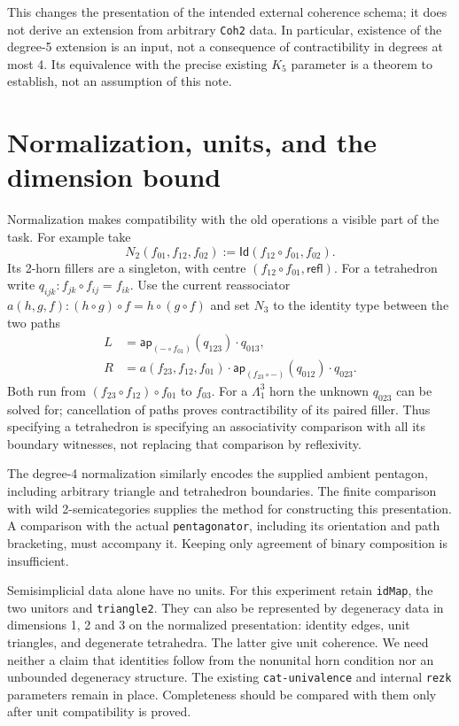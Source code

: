 \documentclass[11pt]{amsart}
\newcommand{\Id}{\mathsf{Id}}
\newcommand{\code}[1]{\nolinkurl{#1}}
\theoremstyle{definition}
\begin{document}
This changes the presentation of the intended external coherence schema;
it does not derive an extension from arbitrary \code{Coh2} data.
In particular, existence of the degree-5 extension is an input, not a
consequence of contractibility in degrees at most 4. Its equivalence
with the precise existing $K_5$ parameter is a theorem to establish,
not an assumption of this note.

\section{Normalization, units, and the dimension bound}

Normalization makes compatibility with the old operations a visible
part of the task. For example take
\[
 N_2(f_{01},f_{12},f_{02})
   :=\Id(f_{12}\circ f_{01},f_{02}).
\]
Its 2-horn fillers are a singleton, with centre
$(f_{12}\circ f_{01},\mathsf{refl})$.
For a tetrahedron write $q_{ijk}:f_{jk}\circ f_{ij}=f_{ik}$.
Use the current reassociator
$a(h,g,f):(h\circ g)\circ f=h\circ(g\circ f)$ and set $N_3$ to
the identity type between the two paths
\begin{align*}
 L&=\mathsf{ap}_{(-\circ f_{01})}(q_{123})\cdot q_{013},\\
 R&=a(f_{23},f_{12},f_{01})\cdot
       \mathsf{ap}_{(f_{23}\circ-)}(q_{012})\cdot q_{023}.
\end{align*}
Both run from $(f_{23}\circ f_{12})\circ f_{01}$ to $f_{03}$.
For a $\Lambda^3_1$ horn the unknown $q_{023}$ can be solved for;
cancellation of paths proves contractibility of its paired filler.
Thus specifying a tetrahedron is specifying an associativity comparison
with all its boundary witnesses, not replacing that comparison by
reflexivity.

The degree-4 normalization similarly encodes the supplied ambient
pentagon, including arbitrary triangle and tetrahedron boundaries.
The finite comparison with wild 2-semicategories supplies the method
for constructing this presentation. A comparison with the actual
\code{pentagonator}, including its orientation and path bracketing,
must accompany it. Keeping only agreement of binary composition is
insufficient.

Semisimplicial data alone have no units. For this experiment retain
\code{idMap}, the two unitors and \code{triangle2}. They can also be
represented by degeneracy data in dimensions 1, 2 and 3 on the
normalized presentation: identity edges, unit triangles, and degenerate
tetrahedra. The latter give unit coherence. We need neither a claim
that identities follow from the nonunital horn condition nor an
unbounded degeneracy structure. The existing \code{cat-univalence}
and internal \code{rezk} parameters remain in place. Completeness
should be compared with them only after unit compatibility is proved.
\end{document}
